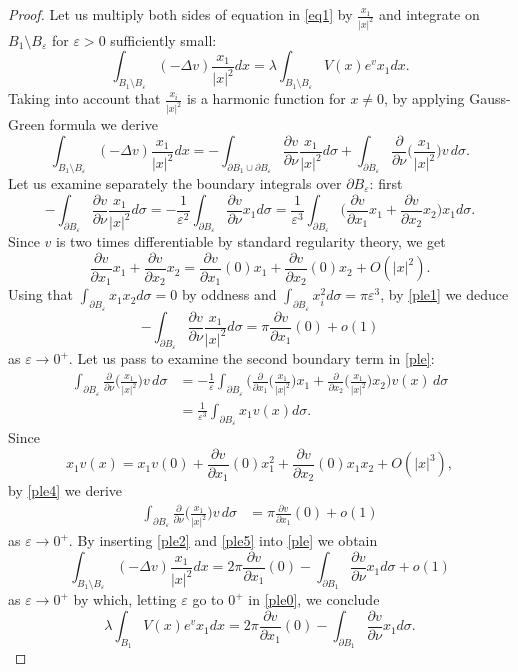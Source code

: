 \documentclass[reqno,11pt]{amsart}
\theoremstyle{definition}
\numberwithin{equation}{section}
\newcommand{\la}{\lambda}
\newcommand{\e}{\varepsilon}
\renewcommand{\(}{\left(}
\renewcommand{\)}{\right)}
\renewcommand{\[}{\left[}
\renewcommand{\]}{\right]}
\newcommand{\beq}{\begin{equation}}
\newcommand{\eeq}{\end{equation}}
\begin{document}
{\begin{proof}
Let us multiply both sides of equation in \eqref{eq1} by $\frac{x_1}{|x|^{2}}$ and integrate on $B_1\setminus B_\e$ for $\e>0$ sufficiently small:
\beq\label{ple0}\int_{B_1\setminus B_\e}(-\Delta v)\frac{x_1}{|x|^{2}}dx=\la\int_{B_1\setminus B_\e}V(x)e^vx_1 dx .\eeq
Taking into account that $\frac{x_i}{|x|^{2}}$ is a harmonic function for $x\neq 0$, by applying Gauss-Green formula we derive
\beq\label{ple}\int_{B_1\setminus B_\e}(-\Delta v)\frac{x_1}{|x|^{2}}dx= -\int_{\partial B_1\cup \partial B_\e}\frac{\partial v}{\partial \nu}\frac{x_1}{|x|^{2}}d\sigma+ \int_{\partial B_\e}\frac{\partial }{\partial \nu}\bigg(\frac{x_1}{|x|^{2}}\bigg) v\,d\sigma.\eeq
Let us examine separately the boundary integrals over $\partial B_\e$: first
\beq\label{ple1}-\int_{ \partial B_\e}\frac{\partial v}{\partial \nu}\frac{x_1}{|x|^{2}}d\sigma=- \frac{1}{\e^{2}}\int_{ \partial B_\e}\frac{\partial v}{\partial \nu}x_1d\sigma= \frac{1}{\e^{3}}\int_{ \partial B_\e} \bigg(\frac{\partial v}{\partial x_1} x_1+\frac{\partial v}{\partial x_2} x_2\bigg)x_1d\sigma.
\eeq  Since $v$ is two times differentiable  by standard regularity theory, 
we get$$\frac{\partial v}{\partial x_1} x_1+\frac{\partial v}{\partial x_2} x_2=\frac{\partial v}{\partial x_1} (0)x_1+ \frac{\partial v}{\partial x_2} (0)x_2+O(|x|^2).$$
Using that  $\int_{\partial B_\e} x_1x_2d\sigma=0$ by oddness  and $\int_{\partial B_\e} x_i^2d\sigma=\pi\e^{3}$, 
by \eqref{ple1} we deduce  
\beq\label{ple2}-\int_{ \partial B_\e}\frac{\partial v}{\partial \nu}\frac{x_1}{|x|^{2}}d\sigma=\pi\frac{\partial v}{\partial x_1} (0)+o(1)\eeq as $\e\to 0^+$.
Let us pass to examine the second boundary term in \eqref{ple}: 
\beq\label{ple4}\begin{aligned}\int_{\partial B_\e}\frac{\partial }{\partial \nu}\bigg(\frac{x_1}{|x|^{2}}\bigg) v\,d\sigma&=-\frac1\e\int_{\partial B_\e}\bigg(\frac{\partial }{\partial x_1}\bigg(\frac{x_1}{|x|^{2}}\bigg) x_1+ \frac{\partial }{\partial x_2}\bigg(\frac{x_1}{|x|^{2}}\bigg) x_2\bigg)v(x)\,d\sigma
\\ &= \frac{1}{\e^{3}}\int_{\partial B_\e}x_1v(x)d\sigma. 
\end{aligned}\eeq
Since $$x_1v(x)=x_1v(0)+\frac{\partial v}{\partial x_1} (0)x_1^2+ \frac{\partial v}{\partial x_2} (0)x_1x_2+O(|x|^3),$$ by \eqref{ple4} we derive \beq\label{ple5}\begin{aligned}\int_{\partial B_\e}\frac{\partial }{\partial \nu}\bigg(\frac{x_1}{|x|^{2}}\bigg) v\,d\sigma&= \pi\frac{\partial v}{\partial x_1} (0) +o(1)
\end{aligned}\eeq
as $\e\to 0^+$. 
By inserting \eqref{ple2} and \eqref{ple5} into \eqref{ple} we obtain
$$\int_{B_1\setminus B_\e}(-\Delta v)\frac{x_1}{|x|^{2}}dx= 2\pi\frac{\partial v}{\partial x_1} (0)-\int_{\partial B_1}\frac{\partial v}{\partial \nu} x_1d\sigma+o(1)$$
as $\e\to 0^+$ by which, letting $\e$ go to $0^+$ in \eqref{ple0}, we conclude
\beq\label{ple6}\la\int_{B_1}V(x)e^v x_1 dx=2\pi \frac{\partial v}{\partial x_1} (0) -\int_{\partial B_1}\frac{\partial v}{\partial \nu}x_1d\sigma.\eeq 



\end{proof}}
\end{document}

